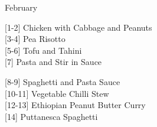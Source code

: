 		\begin{menu}{February}
    
    \begin{recipelist}
    
        {\scriptsize[1-2]} Chicken with Cabbage and Peanuts\\
        {\scriptsize[3-4]} Pea Risotto\\
        {\scriptsize[5-6]} Tofu and Tahini\\
        {\scriptsize[7]} Pasta and Stir in Sauce\\%
    \end{recipelist}%
    \begin{recipelist}
    
        {\scriptsize[8-9]} Spaghetti and Pasta Sauce\\
        {\scriptsize[10-11]} Vegetable Chilli Stew\\
        {\scriptsize[12-13]} Ethiopian Peanut Butter Curry\\
        {\scriptsize[14]} Puttanesca Spaghetti\\%
    \end{recipelist}\par%
  

\end{menu}
